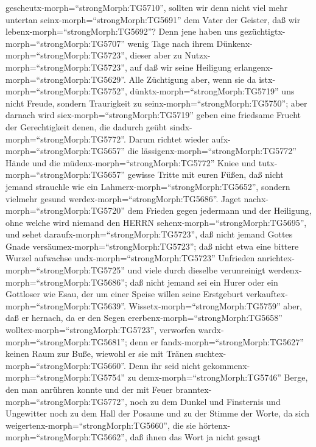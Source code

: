 gescheutx-morph=``strongMorph:TG5710'', sollten wir denn nicht viel mehr
untertan seinx-morph=``strongMorph:TG5691'' dem Vater der Geister, daß
wir lebenx-morph=``strongMorph:TG5692''?  Denn jene haben
uns gezüchtigtx-morph=``strongMorph:TG5707'' wenig Tage nach ihrem
Dünkenx-morph=``strongMorph:TG5723'', dieser aber zu
Nutzx-morph=``strongMorph:TG5723'', auf daß wir seine Heiligung
erlangenx-morph=``strongMorph:TG5629''.  Alle Züchtigung
aber, wenn sie da istx-morph=``strongMorph:TG5752'',
dünktx-morph=``strongMorph:TG5719'' uns nicht Freude, sondern
Traurigkeit zu seinx-morph=``strongMorph:TG5750''; aber darnach wird
siex-morph=``strongMorph:TG5719'' geben eine friedsame Frucht der
Gerechtigkeit denen, die dadurch geübt
sindx-morph=``strongMorph:TG5772''.  Darum richtet wieder
aufx-morph=``strongMorph:TG5657'' die
lässigenx-morph=``strongMorph:TG5772'' Hände und die
müdenx-morph=``strongMorph:TG5772'' Kniee  und
tutx-morph=``strongMorph:TG5657'' gewisse Tritte mit euren Füßen, daß
nicht jemand strauchle wie ein Lahmerx-morph=``strongMorph:TG5652'',
sondern vielmehr gesund werdex-morph=``strongMorph:TG5686''.
 Jaget nachx-morph=``strongMorph:TG5720'' dem Frieden gegen
jedermann und der Heiligung, ohne welche wird niemand den HERRN
sehenx-morph=``strongMorph:TG5695'',  und sehet
daraufx-morph=``strongMorph:TG5723'', daß nicht jemand Gottes Gnade
versäumex-morph=``strongMorph:TG5723''; daß nicht etwa eine bittere
Wurzel aufwachse undx-morph=``strongMorph:TG5723'' Unfrieden
anrichtex-morph=``strongMorph:TG5725'' und viele durch dieselbe
verunreinigt werdenx-morph=``strongMorph:TG5686'';  daß
nicht jemand sei ein Hurer oder ein Gottloser wie Esau, der um einer
Speise willen seine Erstgeburt verkauftex-morph=``strongMorph:TG5639''.
 Wissetx-morph=``strongMorph:TG5759'' aber, daß er hernach,
da er den Segen ererbenx-morph=``strongMorph:TG5658''
wolltex-morph=``strongMorph:TG5723'', verworfen
wardx-morph=``strongMorph:TG5681''; denn er
fandx-morph=``strongMorph:TG5627'' keinen Raum zur Buße, wiewohl er sie
mit Tränen suchtex-morph=``strongMorph:TG5660''.  Denn ihr
seid nicht gekommenx-morph=``strongMorph:TG5754'' zu
demx-morph=``strongMorph:TG5746'' Berge, den man anrühren konnte und der
mit Feuer branntex-morph=``strongMorph:TG5772'', noch zu dem Dunkel und
Finsternis und Ungewitter  noch zu dem Hall der Posaune und
zu der Stimme der Worte, da sich
weigertenx-morph=``strongMorph:TG5660'', die sie
hörtenx-morph=``strongMorph:TG5662'', daß ihnen das Wort ja nicht gesagt
